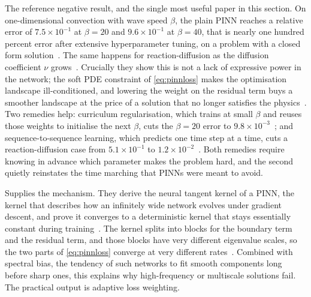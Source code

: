 \documentclass[11pt, a4paper]{article}
\begin{document}
\begin{description}[style=nextline]
  \item[Krishnapriyan et al.~\citep{pinnfailure}]
  The reference negative result, and the single most useful paper in this
  section. On one-dimensional convection with wave speed $\beta$, the plain
  PINN reaches a relative error of $7.5 \times 10^{-1}$ at $\beta = 20$ and
  $9.6 \times 10^{-1}$ at $\beta = 40$, that is nearly one hundred percent
  error after extensive hyperparameter tuning, on a problem with a closed
  form solution~\citep[\S{}3.1, Table~1]{pinnfailure}. The same happens for
  reaction-diffusion as the diffusion coefficient $\nu$
  grows~\citep[eq.~(10), fig.~2]{pinnfailure}. Crucially they show this is
  not a lack of expressive power in the network; the soft PDE constraint of
  \cref{eq:pinnloss} makes the optimisation landscape ill-conditioned, and
  lowering the weight on the residual term buys a smoother landscape at the
  price of a solution that no longer satisfies the
  physics~\citep[\S{}4]{pinnfailure}. Two remedies help: curriculum
  regularisation, which trains at small $\beta$ and reuses those weights to
  initialise the next $\beta$, cuts the $\beta = 20$ error to $9.8 \times
  10^{-3}$~\citep[Table~1]{pinnfailure}; and sequence-to-sequence learning,
  which predicts one time step at a time, cuts a reaction-diffusion case
  from $5.1 \times 10^{-1}$ to $1.2 \times
  10^{-2}$~\citep[Table~2]{pinnfailure}. Both remedies require knowing in
  advance
  which parameter makes the problem hard, and the second quietly reinstates
  the time marching that PINNs were meant to avoid.
  \item[Wang, Yu and Perdikaris~\citep{wangntk}]
  Supplies the mechanism. They derive the neural tangent kernel of a PINN,
  the kernel that describes how an infinitely wide network evolves under
  gradient descent, and prove it converges to a deterministic kernel that
  stays essentially constant during training~\citep[\S{}4,
  Theorem~4.4]{wangntk}. The kernel splits into blocks for the boundary term and
  the residual term, and those blocks have very different eigenvalue scales,
  so the two parts of \cref{eq:pinnloss} converge at very different
  rates~\citep[\S{}7.1, figs.~2--3]{wangntk}. Combined with spectral bias, the
  tendency of such networks to fit smooth components long before sharp ones,
  this explains why high-frequency or multiscale solutions fail. The
  practical output is adaptive loss weighting.
  \item[Wang et al., expert's guide~\citep{expertguide}]

\end{description}
\end{document}
